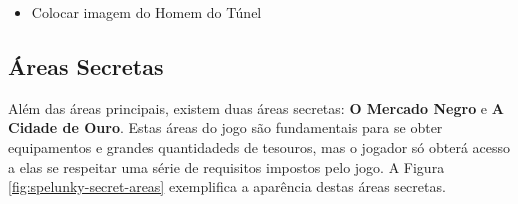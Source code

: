\begin{mdframed}[backgroundcolor=green!20]
\begin{itemize}
    \item
		Colocar imagem do Homem do Túnel
\end{itemize}
\end{mdframed}


\subsection{Áreas Secretas}
Além das áreas principais, existem duas áreas secretas: \textbf{O Mercado Negro}
e \textbf{A Cidade de Ouro}. Estas áreas do jogo são fundamentais para se obter
equipamentos e grandes quantidadeds de tesouros, mas o jogador só obterá acesso
a elas se respeitar uma série de requisitos impostos pelo jogo. A Figura
\ref{fig:spelunky-secret-areas} exemplifica a aparência destas áreas secretas.

